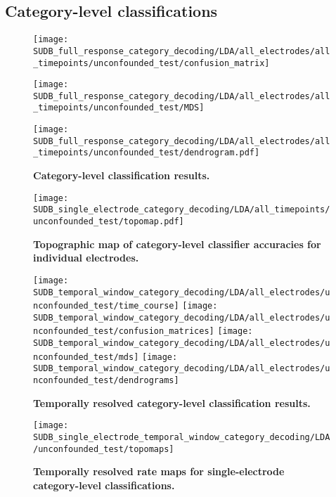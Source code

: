 \subsection{Category-level classifications}
\begin{figure}
    \begin{minipage}[b]{0.32\columnwidth}
        \texttt{[image: SUDB\_full\_response\_category\_decoding/LDA/all\_electrodes/all\_timepoints/unconfounded\_test/confusion\_matrix]}
    \end{minipage}
    \begin{minipage}[b]{0.32\columnwidth}
        \texttt{[image: SUDB\_full\_response\_category\_decoding/LDA/all\_electrodes/all\_timepoints/unconfounded\_test/MDS]}
    \end{minipage}
    \begin{minipage}[b]{0.32\columnwidth}
        \texttt{[image: SUDB\_full\_response\_category\_decoding/LDA/all\_electrodes/all\_timepoints/unconfounded\_test/dendrogram.pdf]}
    \end{minipage}
    \caption{\textbf{Category-level classification results.}}
\end{figure}

\begin{SCfigure}
    \centering
    \texttt{[image: SUDB\_single\_electrode\_category\_decoding/LDA/all\_timepoints/unconfounded\_test/topomap.pdf]}
    \caption{\textbf{Topographic map of category-level classifier accuracies for individual electrodes.}\vspace{15em}}
\end{SCfigure}
\begin{figure}
    \centering
        \texttt{[image: SUDB\_temporal\_window\_category\_decoding/LDA/all\_electrodes/unconfounded\_test/time\_course]}
        \texttt{[image: SUDB\_temporal\_window\_category\_decoding/LDA/all\_electrodes/unconfounded\_test/confusion\_matrices]}
        \texttt{[image: SUDB\_temporal\_window\_category\_decoding/LDA/all\_electrodes/unconfounded\_test/mds]}
        \texttt{[image: SUDB\_temporal\_window\_category\_decoding/LDA/all\_electrodes/unconfounded\_test/dendrograms]}
    \caption{\textbf{Temporally resolved category-level classification results.}}
\end{figure}
\begin{figure}
    \centering
        \texttt{[image: SUDB\_single\_electrode\_temporal\_window\_category\_decoding/LDA/unconfounded\_test/topomaps]}
    \caption{\textbf{Temporally resolved rate maps for single-electrode category-level classifications.}}
\end{figure}

